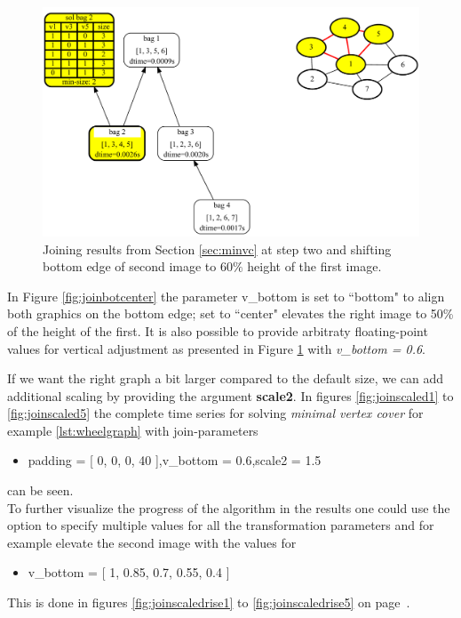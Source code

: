 \documentclass[a4paper, 12pt, bibliography=totoc]{scrartcl}
\begin{document}
\begin{figure}[H]
	\centering
	\includegraphics[width=0.9\linewidth,height=0.9\textheight,keepaspectratio]{images/SVGJOIN/default_062.pdf}
	\caption[Joining results and shifting vertically to 60\%]{Joining results from Section \ref{sec:minvc} at step two and shifting bottom edge of second image to $60\%$ height of the first image.}
	\label{fig:join60}
\end{figure}

In Figure \ref{fig:joinbotcenter} the parameter v\_bottom is set to ``bottom" to align both graphics on the bottom edge; set to ``center" elevates the right image to 50\% of the height of the first. It is also possible to provide arbitraty floating-point values for vertical adjustment as presented in Figure \ref{fig:join60} with \textit{v\_bottom = 0.6}.

If we want the right graph a bit larger compared to the default size, we can add additional scaling by providing the argument \textbf{scale2}. In figures \ref{fig:joinscaled1} to \ref{fig:joinscaled5} the complete time series for solving \textit{minimal vertex cover} for example \ref{lst:wheelgraph} with join-parameters
\begin{itemize}
	\item[] padding = [ 0, 0, 0, 40 ],\quad v\_bottom = 0.6,\quad scale2 = 1.5
\end{itemize}
can be seen. \\
To further visualize the progress of the algorithm in the results one could use the option to specify multiple values for all the transformation parameters and for example elevate the second image with the values for
\begin{itemize}
\item[] v\_bottom = [ 1, 0.85, 0.7, 0.55, 0.4 ]
\end{itemize}
 This is done in figures \ref{fig:joinscaledrise1} to \ref{fig:joinscaledrise5} on page~\pageref{fig:joinscaledrise1}.
\end{document}
